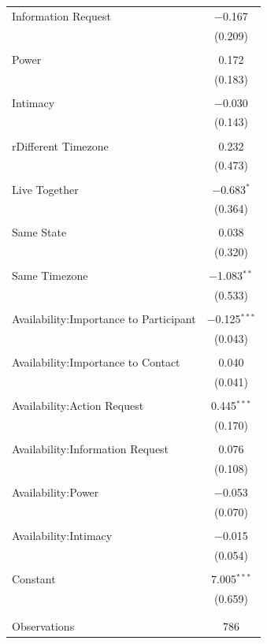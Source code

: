 \documentclass[12pt]{nuthesis}	%
\begin{document}
\begin{appendix}
\begin{table}[!htbp]
\begin{tabular}{@{\extracolsep{5pt}}lc}
 Information Request & $-$0.167 \\ 
  & (0.209) \\ 
  & \\ 
 Power & 0.172 \\ 
  & (0.183) \\ 
  & \\ 
 Intimacy & $-$0.030 \\ 
  & (0.143) \\ 
  & \\ 
 rDifferent Timezone & 0.232 \\ 
  & (0.473) \\ 
  & \\ 
Live Together & $-$0.683$^{*}$ \\ 
  & (0.364) \\ 
  & \\ 
Same State & 0.038 \\ 
  & (0.320) \\ 
  & \\ 
Same Timezone & $-$1.083$^{**}$ \\ 
  & (0.533) \\ 
  & \\ 
 Availability:Importance to Participant & $-$0.125$^{***}$ \\ 
  & (0.043) \\ 
  & \\ 
 Availability:Importance to Contact & 0.040 \\ 
  & (0.041) \\ 
  & \\ 
 Availability:Action Request & 0.445$^{***}$ \\ 
  & (0.170) \\ 
  & \\ 
 Availability:Information Request & 0.076 \\ 
  & (0.108) \\ 
  & \\ 
 Availability:Power & $-$0.053 \\ 
  & (0.070) \\ 
  & \\ 
 Availability:Intimacy & $-$0.015 \\ 
  & (0.054) \\ 
  & \\ 
 Constant & 7.005$^{***}$ \\ 
  & (0.659) \\ 
  & \\ 
\hline \\[-1.8ex] 
Observations & 786 \\ 

\end{tabular}
\end{table}
\end{appendix}
\end{document}
